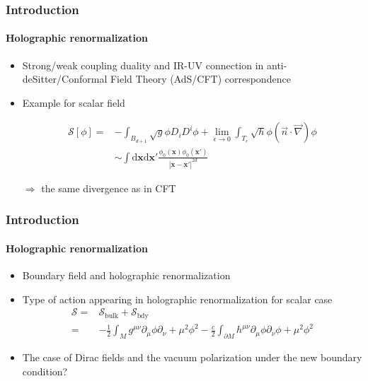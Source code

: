 \documentclass[french]{beamer}
\newcommand{\dd}[0]{\textrm{d}}
\begin{document}
\begin{frame}
\frametitle{Introduction}
\framesubtitle{Holographic renormalization}

\begin{itemize}
\item Strong/weak coupling duality and IR-UV connection in anti-deSitter/Conformal Field Theory (AdS/CFT) correspondence

\item Example for scalar field

\begin{equation*}
\begin{split}
\mathcal{S}[\phi] = & -\int_{B_{d+1}} \sqrt{g} \phi D_i D^i \phi + 
\lim_{\epsilon\rightarrow 0}\int_{T_\epsilon}  \sqrt{h} \phi (\vec{n}\cdot\vec{\nabla})\phi \\
%
& \sim \int \dd \mathbf{x} \dd \mathbf{x}' 
\frac{\phi_0(\mathbf{x})\phi_0(\mathbf{x}')}{|\mathbf{x} - \mathbf{x}'|^{2d}}
\end{split}
\end{equation*}

$\Rightarrow$ the same divergence as in CFT

\end{itemize}

\end{frame}
\begin{frame}
\frametitle{Introduction}
\framesubtitle{Holographic renormalization}

\begin{itemize}

\item Boundary field and holographic renormalization

\item Type of action appearing in holographic renormalization for scalar case
\begin{equation*}
\begin{split}
\mathcal{S} = & \mathcal{S}_{\mathrm{bulk}} + \mathcal{S}_{\mathrm{bdy}}
\\ = &
-\frac 1 2 \int_M g^{\mu\nu} \partial_\mu \phi \partial_{\nu} + 
\mu^2\phi^2 - \frac c 2 \int_{\partial M}h^{\mu\nu}\partial_\mu\phi\partial_\nu\phi + \mu^2\phi^2
\end{split}
\end{equation*}

\item The case of Dirac fields and the vacuum polarization under the new boundary condition?

\end{itemize}

\end{frame}
\end{document}
